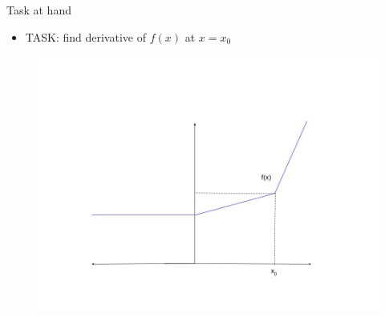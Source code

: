 \documentclass{beamer}
\begin{document}
\begin{frame}{Task at hand}
\begin{itemize}

\item TASK: find derivative of $f(x)$ at $x = x_0$
\end{itemize}
\begin{figure}
\centering
\includegraphics[scale = 0.25]{../assets/lasso/diagrams/subgradient_1.jpg}

\label{fig:Non-differentiable function}
\end{figure}


\end{frame}
\end{document}
